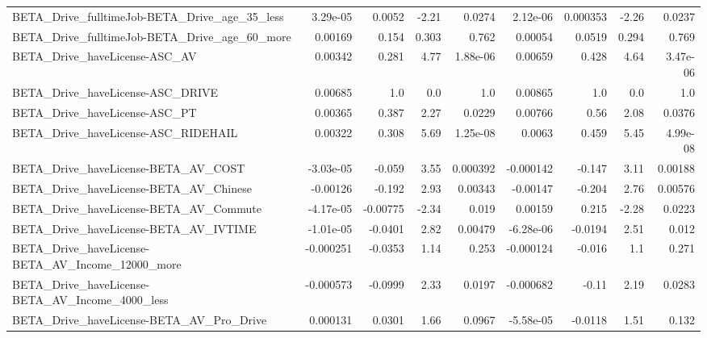 \begin{tabular}{lrrrrrrrr}
BETA\_Drive\_fulltimeJob-BETA\_Drive\_age\_35\_less      &    3.29e-05 &       0.0052 &     -2.21 &   0.0274 &   2.12e-06 &    0.000353 &        -2.26 &        0.0237 \\
BETA\_Drive\_fulltimeJob-BETA\_Drive\_age\_60\_more      &     0.00169 &        0.154 &     0.303 &    0.762 &    0.00054 &      0.0519 &        0.294 &         0.769 \\
BETA\_Drive\_haveLicense-ASC\_AV                      &     0.00342 &        0.281 &      4.77 & 1.88e-06 &    0.00659 &       0.428 &         4.64 &      3.47e-06 \\
BETA\_Drive\_haveLicense-ASC\_DRIVE                   &     0.00685 &          1.0 &       0.0 &      1.0 &    0.00865 &         1.0 &          0.0 &           1.0 \\
BETA\_Drive\_haveLicense-ASC\_PT                      &     0.00365 &        0.387 &      2.27 &   0.0229 &    0.00766 &        0.56 &         2.08 &        0.0376 \\
BETA\_Drive\_haveLicense-ASC\_RIDEHAIL                &     0.00322 &        0.308 &      5.69 & 1.25e-08 &     0.0063 &       0.459 &         5.45 &      4.99e-08 \\
BETA\_Drive\_haveLicense-BETA\_AV\_COST                &   -3.03e-05 &       -0.059 &      3.55 & 0.000392 &  -0.000142 &      -0.147 &         3.11 &       0.00188 \\
BETA\_Drive\_haveLicense-BETA\_AV\_Chinese             &    -0.00126 &       -0.192 &      2.93 &  0.00343 &   -0.00147 &      -0.204 &         2.76 &       0.00576 \\
BETA\_Drive\_haveLicense-BETA\_AV\_Commute             &   -4.17e-05 &     -0.00775 &     -2.34 &    0.019 &    0.00159 &       0.215 &        -2.28 &        0.0223 \\
BETA\_Drive\_haveLicense-BETA\_AV\_IVTIME              &   -1.01e-05 &      -0.0401 &      2.82 &  0.00479 &  -6.28e-06 &     -0.0194 &         2.51 &         0.012 \\
BETA\_Drive\_haveLicense-BETA\_AV\_Income\_12000\_more   &   -0.000251 &      -0.0353 &      1.14 &    0.253 &  -0.000124 &      -0.016 &          1.1 &         0.271 \\
BETA\_Drive\_haveLicense-BETA\_AV\_Income\_4000\_less    &   -0.000573 &      -0.0999 &      2.33 &   0.0197 &  -0.000682 &       -0.11 &         2.19 &        0.0283 \\
BETA\_Drive\_haveLicense-BETA\_AV\_Pro\_Drive           &    0.000131 &       0.0301 &      1.66 &   0.0967 &  -5.58e-05 &     -0.0118 &         1.51 &         0.132 \\

\end{tabular}
